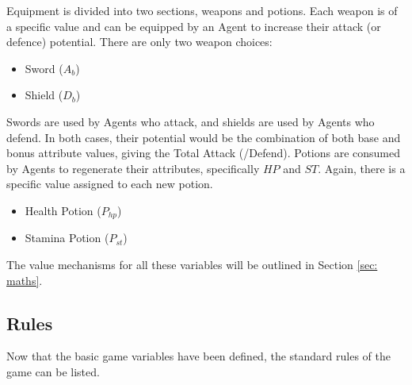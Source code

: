 Equipment is divided into two sections, weapons and potions. Each weapon is of a specific value and can be equipped by an Agent to increase their attack (or defence) potential. There are only two weapon choices:

\begin{itemize}
    \item Sword ($A_b$)
    \item Shield ($D_b$)
\end{itemize}

Swords are used by Agents who attack, and shields are used by Agents who defend. In both cases, their potential would be the combination of both base and bonus attribute values, giving the Total Attack (/Defend). Potions are consumed by Agents to regenerate their attributes, specifically $HP$ and $ST$. Again, there is a specific value assigned to each new potion. 

\begin{itemize}
    \item Health Potion ($P_{hp}$)
    \item Stamina Potion ($P_{st}$)
\end{itemize}

The value mechanisms for all these variables will be outlined in Section \ref{sec: maths}. 

\subsection{Rules}
Now that the basic game variables have been defined, the standard rules of the game can be listed. 


